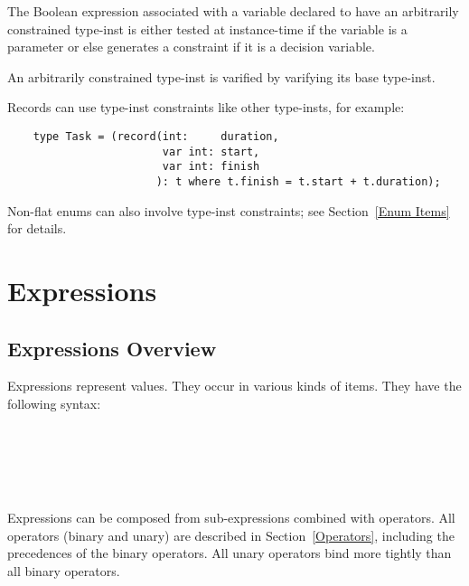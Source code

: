 \documentclass[10pt]{scrartcl}
\begin{document}
{The Boolean expression associated with a variable declared to have an
arbitrarily constrained type-inst is either tested at instance-time if the
variable is a parameter or else generates a constraint if it is a decision
variable.

An arbitrarily constrained type-inst is varified by varifying its base
type-inst.

Records can use type-inst constraints like other type-insts, for example:
\begin{verbatim}
    type Task = (record(int:     duration,
                        var int: start,
                        var int: finish
                       ): t where t.finish = t.start + t.duration);
\end{verbatim}

Non-flat enums can also involve type-inst constraints;  see
Section~\ref{Enum Items} for details.
}

\section{Expressions}
  \label{Expressions}
\subsection{Expressions Overview}
     \label{Expressions Overview}
Expressions represent values.  They occur in various kinds of items.  They
have the following syntax:
\begin{productions}
    \RuleExpr \\
    \RuleExprAtom \\
    \RuleExprBinopTail \\
    \RuleExprAtomHead \\
    \RuleExprAtomTail
\end{productions}

Expressions can be composed from sub-expressions combined with operators.
All operators (binary and unary) are described in Section~\ref{Operators},
including the precedences of the binary operators.  All unary operators bind
more tightly than all binary operators.
\end{document}
